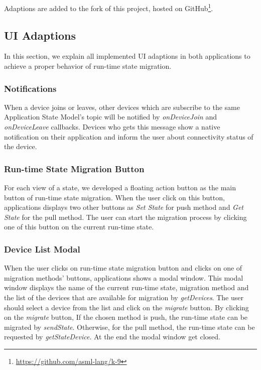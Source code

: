 Adaptions are added to the fork of this project, hosted on GitHub\footnote{\url{https://github.com/asml-lang/k-9}}. 


\subsection{UI Adaptions}
In this section, we explain all implemented UI adaptions in both applications to achieve a proper behavior of run-time state migration. 

\subsubsection{Notifications}
When a device joins or leaves, other devices which are subscribe to the same Application State Model's topic will be notified by \textit{onDeviceJoin} and \textit{onDeviceLeave} callbacks. Devices who gets this message show a native notification on their application and inform the user about connectivity status of the device.

\subsubsection{Run-time State Migration Button}
For each view of a state, we developed a floating action button as the main button of run-time state migration. When the user click on this button, applications displays two other buttons as \textit{Set State} for push method and \textit{Get State} for the pull method. The user can start the migration process by clicking one of this button on the current run-time state.

\subsubsection{Device List Modal}
When the user clicks on run-time state migration button and clicks on one of migration methods' buttons, applications shows a modal window. This modal window displays the name of the current run-time state, migration method and the list of the devices that are available for migration by \textit{getDevices}. The user should select a device from the list and click on the \textit{migrate} button. By clicking on the \textit{migrate} button, If the chosen method is push, the run-time state can be migrated by \textit{sendState}. Otherwise, for the pull method, the run-time state can be requested by \textit{getStateDevice}. At the end the modal window get closed. 

